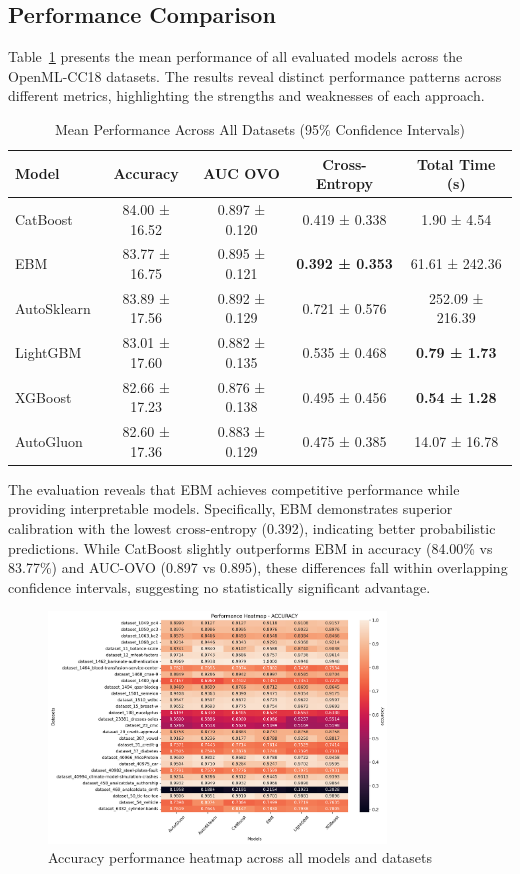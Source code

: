 \documentclass[12pt]{article}
\begin{document}
\subsection{Performance Comparison}

Table~\ref{tab:mean_performance} presents the mean performance of all evaluated models across the OpenML-CC18 datasets. The results reveal distinct performance patterns across different metrics, highlighting the strengths and weaknesses of each approach.

\begin{table}[H]
\centering
\caption{Mean Performance Across All Datasets (95\% Confidence Intervals)}
\label{tab:mean_performance}
\begin{tabular}{@{}lcccc@{}}
\toprule
Model & Accuracy & AUC OVO & Cross-Entropy & Total Time (s) \\
\midrule
CatBoost & 84.00 ± 16.52 & 0.897 ± 0.120 & 0.419 ± 0.338 & 1.90 ± 4.54 \\
EBM & 83.77 ± 16.75 & 0.895 ± 0.121 & \textbf{0.392 ± 0.353} & 61.61 ± 242.36 \\
AutoSklearn & 83.89 ± 17.56 & 0.892 ± 0.129 & 0.721 ± 0.576 & 252.09 ± 216.39 \\
LightGBM & 83.01 ± 17.60 & 0.882 ± 0.135 & 0.535 ± 0.468 & \textbf{0.79 ± 1.73} \\
XGBoost & 82.66 ± 17.23 & 0.876 ± 0.138 & 0.495 ± 0.456 & \textbf{0.54 ± 1.28} \\
AutoGluon & 82.60 ± 17.36 & 0.883 ± 0.129 & 0.475 ± 0.385 & 14.07 ± 16.78 \\
\bottomrule
\end{tabular}
\end{table}

The evaluation reveals that EBM achieves competitive performance while providing interpretable models. Specifically, EBM demonstrates superior calibration with the lowest cross-entropy (0.392), indicating better probabilistic predictions. While CatBoost slightly outperforms EBM in accuracy (84.00\% vs 83.77\%) and AUC-OVO (0.897 vs 0.895), these differences fall within overlapping confidence intervals, suggesting no statistically significant advantage.

\begin{figure}[ht]
\centering
\includegraphics[width=0.8\textwidth]{stat_results/heatmap_accuracy.png}
\caption{Accuracy performance heatmap across all models and datasets}
\label{fig:accuracy_heatmap}
\end{figure}
\end{document}
